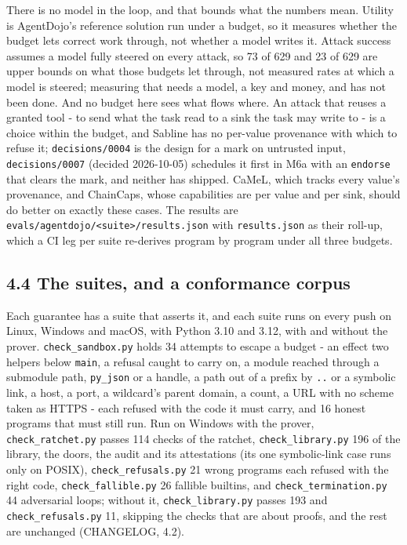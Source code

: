 \documentclass[
]{article}
\begin{document}
There is no model in the loop, and that bounds what the numbers mean.
Utility is AgentDojo's reference solution run under a budget, so it
measures whether the budget lets correct work through, not whether a
model writes it. Attack success assumes a model fully steered on every
attack, so 73 of 629 and 23 of 629 are upper bounds on what those
budgets let through, not measured rates at which a model is steered;
measuring that needs a model, a key and money, and has not been done.
And no budget here sees what flows where. An attack that reuses a
granted tool - to send what the task read to a sink the task may write
to - is a choice within the budget, and Sabline has no per-value
provenance with which to refuse it; \texttt{decisions/0004} is the
design for a mark on untrusted input, \texttt{decisions/0007} (decided
2026-10-05) schedules it first in M6a with an \texttt{endorse} that
clears the mark, and neither has shipped. CaMeL, which tracks every
value's provenance, and ChainCaps, whose capabilities are per value and
per sink, should do better on exactly these cases. The results are
\texttt{evals/agentdojo/\textless{}suite\textgreater{}/results.json}
with \texttt{results.json} as their roll-up, which a CI leg per suite
re-derives program by program under all three budgets.

\subsection{4.4 The suites, and a conformance
corpus}\label{the-suites-and-a-conformance-corpus}

Each guarantee has a suite that asserts it, and each suite runs on every
push on Linux, Windows and macOS, with Python 3.10 and 3.12, with and
without the prover. \texttt{check\_sandbox.py} holds 34 attempts to
escape a budget - an effect two helpers below \texttt{main}, a refusal
caught to carry on, a module reached through a submodule path,
\texttt{py\_json} or a handle, a path out of a prefix by \texttt{..} or
a symbolic link, a host, a port, a wildcard's parent domain, a count, a
URL with no scheme taken as HTTPS - each refused with the code it must
carry, and 16 honest programs that must still run. Run on Windows with
the prover, \texttt{check\_ratchet.py} passes 114 checks of the ratchet,
\texttt{check\_library.py} 196 of the library, the doors, the audit and
its attestations (its one symbolic-link case runs only on POSIX),
\texttt{check\_refusals.py} 21 wrong programs each refused with the
right code, \texttt{check\_fallible.py} 26 fallible builtins, and
\texttt{check\_termination.py} 44 adversarial loops; without it,
\texttt{check\_library.py} passes 193 and \texttt{check\_refusals.py}
11, skipping the checks that are about proofs, and the rest are
unchanged (CHANGELOG, 4.2).
\end{document}
